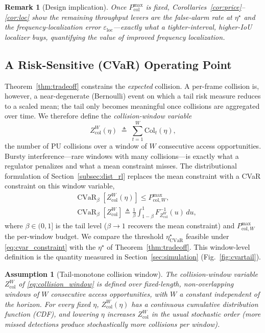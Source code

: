 \documentclass[journal]{IEEEtran}
\newtheorem{assumption}{Assumption}
\newtheorem{remark}{Remark}
\newcommand{\defeq}{\triangleq}
\newcommand{\thr}{\eta}                    %
\newcommand{\Pcolmax}{P_{\mathrm{col}}^{\max}} %
\newcommand{\Zcol}{Z_{\mathrm{col}}}        %
\DeclareMathOperator{\CVaR}{CVaR}
\newcommand{\cvarcol}{\beta}                %
\newcommand{\thrcvar}{\thr^{\star}_{\mathrm{CVaR}}} %
\newcommand{\Qinv}{F^{-1}}                   %
\newcommand{\PcolmaxW}{P_{\mathrm{col},W}^{\max}}  %
\newcommand{\eloc}{\varepsilon_{\mathrm{loc}}}
\begin{document}
\begin{remark}[Design implication]
Once $\Pcolmax$ is fixed, Corollaries~\ref{cor:price}--\ref{cor:loc} show the
remaining throughput levers are the false-alarm rate at $\thr^{\star}$ and the
frequency-localization error $\eloc$---exactly what a tighter-interval,
higher-IoU localizer buys, quantifying the value of improved frequency
localization.
\end{remark}

\subsection{A Risk-Sensitive (CVaR) Operating Point}
\label{subsec:thmD}
Theorem~\ref{thm:tradeoff} constrains the \emph{expected} collision. A
per-frame collision is, however, a near-degenerate (Bernoulli) event on which
a tail risk measure reduces to a scaled mean; the tail only becomes
meaningful once collisions are aggregated over time. We therefore define the
\emph{collision-window variable}
\begin{equation}
\Zcol^{W}(\thr)\;\defeq\;\sum_{t=1}^{W}\mathrm{Col}_t(\thr),
\label{eq:collision_window}
\end{equation}
the number of PU collisions over a window of $W$ consecutive access
opportunities. Bursty interference---rare windows with many collisions---is
exactly what a regulator penalizes and what a mean constraint misses. The
distributional formulation of Section~\ref{subsec:dist_rl} replaces the mean
constraint with a CVaR constraint on this window
variable,
\begin{equation}
\begin{aligned}
&\CVaR_{\cvarcol}\!\left[\Zcol^{W}(\thr)\right]\le\PcolmaxW,\\
&\CVaR_{\cvarcol}[\Zcol^{W}]\defeq\frac{1}{\cvarcol}\!\int_{1-\cvarcol}^{1}\!\!
\Qinv_{\Zcol^{W}}(u)\,du,
\end{aligned}
\label{eq:cvar_constraint}
\end{equation}
where $\cvarcol\in(0,1]$ is the tail level ($\cvarcol\to1$ recovers the mean
constraint) and $\PcolmaxW$ the per-window budget. We compare the threshold
$\thrcvar$ feasible under \eqref{eq:cvar_constraint} with the $\thr^{\star}$
of Theorem~\ref{thm:tradeoff}. This window-level definition is the quantity
measured in Section~\ref{sec:simulation} (Fig.~\ref{fig:cvartail}).

\begin{assumption}[Tail-monotone collision window]
\label{as:tailmono}
The collision-window variable $\Zcol^{W}$ of \eqref{eq:collision_window} is
defined over \emph{fixed-length, non-overlapping} windows of $W$ consecutive
access opportunities, with $W$ a constant independent of the horizon. For
every fixed $\thr$, $\Zcol^{W}(\thr)$ has a continuous cumulative
distribution function (CDF), and lowering
$\thr$ increases $\Zcol^{W}$ in the usual stochastic order (more missed
detections produce stochastically more collisions per window).
\end{assumption}
\end{document}
